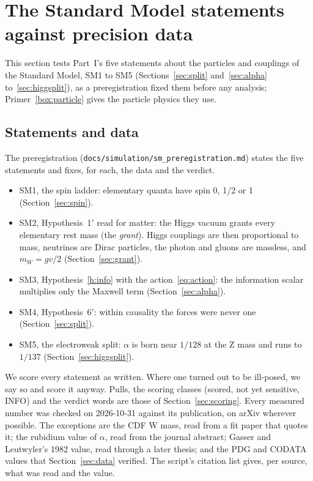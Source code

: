 \section{The Standard Model statements against precision data}\label{sec:sm}

This section tests Part~I's five statements about the particles and couplings of the Standard Model, SM1 to SM5
(Sections~\ref{sec:split} and~\ref{sec:alpha} to~\ref{sec:higgsplit}), as a preregistration fixed them before any analysis;
Primer~\ref{box:particle} gives the particle physics they use.

\subsection{Statements and data}\label{sec:sm-method}

The preregistration (\texttt{docs/simulation/sm\_preregistration.md}) states the five statements and fixes, for each, the data and the verdict.
\begin{itemize}[nosep]
\item SM1, the spin ladder: elementary quanta have spin 0, 1/2 or 1 (Section~\ref{sec:spin}).
\item SM2, Hypothesis~1$'$ read for matter: the Higgs vacuum grants every elementary rest mass (the \emph{grant}). Higgs couplings are then
proportional to mass, neutrinos are Dirac particles, the photon and gluons are massless, and $m_W=gv/2$ (Section~\ref{sec:grant}).
\item SM3, Hypothesis~\ref{h:info} with the action~\eqref{eq:action}: the information scalar multiplies only the Maxwell term
(Section~\ref{sec:alpha}).
\item SM4, Hypothesis~6$'$: within causality the forces were never one (Section~\ref{sec:split}).
\item SM5, the electroweak split: $\alpha$ is born near $1/128$ at the Z mass and runs to $1/137$ (Section~\ref{sec:higgsplit}).
\end{itemize}
We score every statement as written. Where one turned out to be ill-posed, we say so and score it anyway. Pulls, the scoring classes (scored,
not yet sensitive, INFO) and the verdict words are those of Section~\ref{sec:scoring}. Every measured number was checked on 2026-10-31
against its publication, on arXiv wherever possible. The exceptions are the CDF W mass, read from a fit paper that quotes it; the rubidium
value of $\alpha$, read from the journal abstract; Gasser and Leutwyler's 1982 value, read through a later thesis; and the PDG and CODATA values
that Section~\ref{sec:data} verified. The script's citation list gives, per source, what was read and the value.

